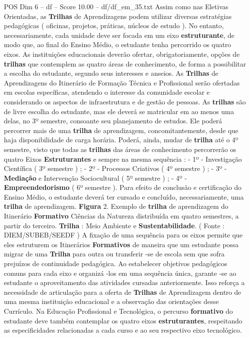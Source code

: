 \begin{textsample}{POS Dim 6 – df – Score 10.00 – df/df\_em\_35.txt}
Assim como nas Eletivas Orientadas, as \textbf{Trilhas} de Aprendizagens podem utilizar diversas estratégias pedagógicas ( oficinas, projetos, práticas, núcleos de estudo ).
No entanto, necessariamente, cada unidade deve ser focada em um eixo \textbf{estruturante}, de modo que, ao final do Ensino Médio, o estudante tenha percorrido os quatro eixos.
As instituições educacionais deverão ofertar, obrigatoriamente, opções de \textbf{trilhas} que contemplem as quatro áreas de conhecimento, de forma a possibilitar a escolha do estudante, segundo seus interesses e anseios.
As \textbf{Trilhas} de Aprendizagens do Itinerário de Formação Técnica e Profissional serão ofertadas em escolas específicas, atendendo o interesse da comunidade escolar e considerando os aspectos de infraestrutura e de gestão de pessoas.
As \textbf{trilhas} são de livre escolha do estudante, mas ele deverá se matricular em ao menos uma delas, no 3º semestre, consoante seu planejamento de estudos.
Ele poderá percorrer mais de uma \textbf{trilha} de aprendizagem, concomitantemente, desde que haja disponibilidade de carga horária.
Poderá, ainda, mudar de \textbf{trilha} até o 4º semestre, visto que todas as \textbf{trilhas} das áreas de conhecimento percorrerão os quatro Eixos \textbf{Estruturantes} e sempre na mesma sequência : - 1º - Investigação Científica ( 3º semestre ) ; - 2º - Processos Criativos ( 4º semestre ) ; - 3º - \textbf{Mediação} e Intervenção Sociocultural ( 5º semestre ) ; - 4º - \textbf{Empreendedorismo} ( 6º semestre ).
Para efeito de conclusão e certificação do Ensino Médio, o estudante deverá ter cursado e concluído, necessariamente, uma \textbf{trilha} de aprendizagem. \textbf{Figura} 2.
Exemplo de \textbf{trilha} de aprendizagem do Itinerário \textbf{Formativo} Ciências da Natureza distribuída em quatro semestres, a partir do terceiro. \textbf{Trilha} : Meio Ambiente e \textbf{Sustentabilidade}. ( Fonte : DIEM/SUBEB/SEEDF ) A fixação de uma sequência para os eixos permite que eles estruturem os Itinerários \textbf{Formativos} de maneira que um estudante possa migrar de uma \textbf{Trilha} para outra ou transferir -se de escola sem que sofra prejuízos de continuidade pedagógica.
Ao estabelecer objetivos pedagógicos comuns para cada eixo e organizá -los em uma sequência única, garante -se ao estudante o aproveitamento das atividades cursadas anteriormente.
Isso reforça a necessidade de articulação para a oferta de \textbf{Trilhas} de Aprendizagem dentro de uma mesma instituição educacional e a observação das orientações desse Currículo.
Na Educação Profissional e Tecnológica, o percurso \textbf{formativo} do estudante deve também contemplar os quatro eixos \textbf{estruturantes}, respeitando as especificidades relacionadas a cada curso e ao seu respectivo eixo tecnológico.

\end{textsample}
